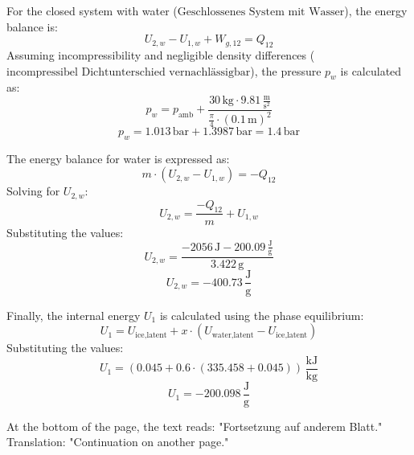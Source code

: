 For the closed system with water (\( \text{Geschlossenes System mit Wasser} \)), the energy balance is:  
\[
U_{2,w} - U_{1,w} + W_{g,12} = Q_{12}
\]  
Assuming incompressibility and negligible density differences (\( \text{incompressibel Dichtunterschied vernachlässigbar} \)), the pressure \( p_w \) is calculated as:  
\[
p_w = p_{\text{amb}} + \frac{30 \, \text{kg} \cdot 9.81 \, \frac{\text{m}}{\text{s}^2}}{\frac{\pi}{4} \cdot (0.1 \, \text{m})^2}
\]  
\[
p_w = 1.013 \, \text{bar} + 1.3987 \, \text{bar} = 1.4 \, \text{bar}
\]  

The energy balance for water is expressed as:  
\[
m \cdot (U_{2,w} - U_{1,w}) = -Q_{12}
\]  
Solving for \( U_{2,w} \):  
\[
U_{2,w} = \frac{-Q_{12}}{m} + U_{1,w}
\]  
Substituting the values:  
\[
U_{2,w} = \frac{-2056 \, \text{J} - 200.09 \, \frac{\text{J}}{\text{g}}}{3.422 \, \text{g}}
\]  
\[
U_{2,w} = -400.73 \, \frac{\text{J}}{\text{g}}
\]  

Finally, the internal energy \( U_1 \) is calculated using the phase equilibrium:  
\[
U_1 = U_{\text{ice,latent}} + x \cdot (U_{\text{water,latent}} - U_{\text{ice,latent}})
\]  
Substituting the values:  
\[
U_1 = (0.045 + 0.6 \cdot (335.458 + 0.045)) \, \frac{\text{kJ}}{\text{kg}}
\]  
\[
U_1 = -200.098 \, \frac{\text{J}}{\text{g}}
\]  

At the bottom of the page, the text reads:  
"Fortsetzung auf anderem Blatt."  
Translation: "Continuation on another page."